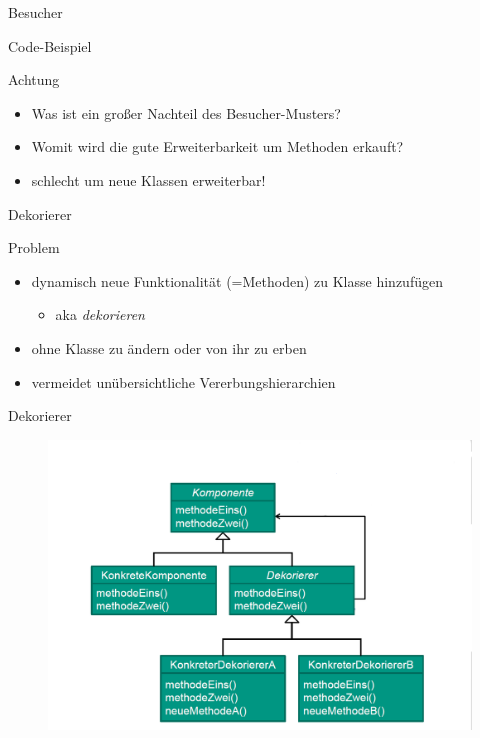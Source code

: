 \documentclass[18pt]{beamer}
\begin{document}
	\begin{frame}{Besucher}
	\begin{center}
		\begin{huge}
			 Code-Beispiel
		\end{huge}
	\end{center}
		\pause
		\begin{alertblock}{Achtung}
			\begin{itemize}
				\item Was ist ein großer Nachteil des Besucher-Musters?
				\item Womit wird die gute Erweiterbarkeit um Methoden erkauft? \pause
				\item schlecht um neue Klassen erweiterbar!
			\end{itemize}
		\end{alertblock}
	\end{frame}

	\begin{frame}{Dekorierer}
		\begin{block}{Problem}
			\begin{itemize}
				\item dynamisch neue Funktionalität (=Methoden) zu Klasse hinzufügen
				\begin{itemize}
					\item aka \emph{dekorieren}
				\end{itemize}
				\item ohne Klasse zu ändern oder von ihr zu erben
				\item vermeidet unübersichtliche Vererbungshierarchien
			\end{itemize}
		\end{block}
	\end{frame}

	\begin{frame}{Dekorierer}
		\begin{figure}
			\includegraphics[scale=0.35]{./pics/tut4/decor.png}
		\end{figure}
	\end{frame}
\end{document}
